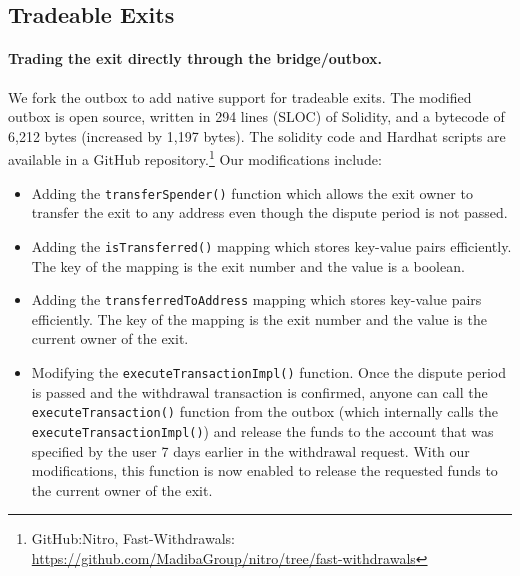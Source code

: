 
\subsection{Tradeable Exits}

\paragraph*{Trading the exit directly through the bridge/outbox.} We fork the \arb \nitro outbox to add native support for tradeable exits. The modified outbox is open source, written in 294 lines (SLOC) of Solidity, and a bytecode of 6,212 bytes (increased by 1,197 bytes). The solidity code and Hardhat scripts are available in a GitHub repository.\footnote{GitHub:Nitro, Fast-Withdrawals: \url{https://github.com/MadibaGroup/nitro/tree/fast-withdrawals}} Our modifications include:

\begin{itemize}
\item Adding the \texttt{transferSpender()} function which allows the exit owner to transfer the exit to any \layerone address even though the dispute period is not passed.
\item Adding the \texttt{isTransferred()} mapping which stores key-value pairs efficiently. The key of the mapping is the exit number and the value is a boolean.
\item Adding the \texttt{transferredToAddress} mapping which stores key-value pairs efficiently. The key of the mapping is the exit number and the value is the current owner of the exit.
\item Modifying the \texttt{executeTransactionImpl()} function. Once the dispute period is passed and the withdrawal transaction is confirmed, anyone can call the \texttt{executeTransaction()} function from the outbox (which internally calls the \texttt{executeTransactionImpl()}) and release the funds to the account that was specified by the user 7 days earlier in the \layertwo withdrawal request. With our modifications, this function is now enabled to release the requested funds to the current owner of the exit.
 \end{itemize}
 
